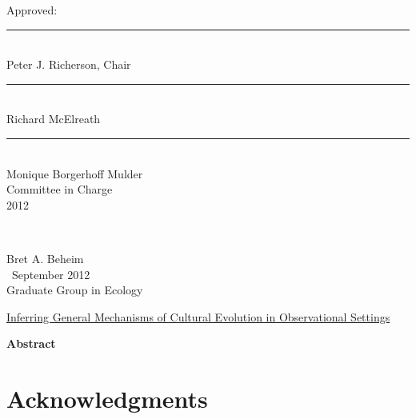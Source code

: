 \documentclass[letterpaper, 12pt, oneside]{book}
\begin{document}
\begin{center}
  Approved:\\
  \vspace{\baselineskip}
  \rule{2.5in}{1pt}\\
  Peter J. Richerson, Chair \\
  \vspace{\baselineskip}
  \rule{2.5in}{1pt}\\
  Richard McElreath \\
  \vspace{\baselineskip}
  \rule{2.5in}{1pt}\\
  Monique Borgerhoff Mulder \\
  \vspace{\baselineskip}
  Committee in Charge\\
  \vspace{\baselineskip}
  2012\\

\end{center}

\newpage

\doublespacing


\tableofcontents

\newpage


~\vspace{-1in} %
\begin{flushright}
\singlespacing
Bret A. Beheim\\
~September 2012\\
Graduate Group in Ecology
\end{flushright}

\centerline{\underline{Inferring General Mechanisms of Cultural Evolution in Observational Settings}}

\centerline{\textbf{Abstract}}



\newpage


\chapter*{\vspace{-1.5in}Acknowledgments}
\end{document}
